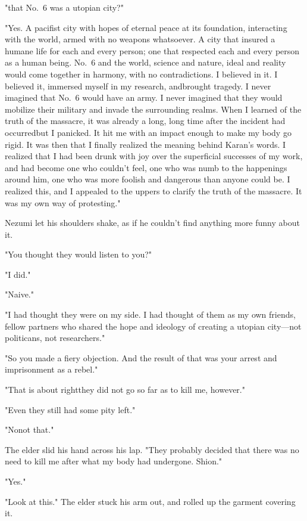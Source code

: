 "\el that No.~6 was a utopian city?"

"Yes. A pacifist city with hopes of eternal peace at its foundation,
interacting with the world, armed with no weapons whatsoever. A city
that insured a humane life for each and every person; one that respected
each and every person as a human being. No.~6 and the world, science and
nature, ideal and reality would come together in harmony, with no
contradictions. I believed in it. I believed it, immersed myself in my
research, and\el brought tragedy. I never imagined that No.~6 would have
an army. I never imagined that they would mobilize their military and
invade the surrounding realms. When I learned of the truth of the
massacre, it was already a long, long time after the incident had
occurred\el but I panicked. It hit me with an impact enough to make my
body go rigid. It was then that I finally realized the meaning behind
Karan's words. I realized that I had been drunk with joy over the
superficial successes of my work, and had become one who couldn't feel,
one who was numb to the happenings around him, one who was more foolish
and dangerous than anyone could be. I realized this, and I appealed to
the uppers to clarify the truth of the massacre. It was my own way of
protesting."

Nezumi let his shoulders shake, as if he couldn't find anything more
funny about it.

"You thought they would listen to you?"

"I did."

"Naive."

"I had thought they were on my side. I had thought of them as my own
friends, fellow partners who shared the hope and ideology of creating a
utopian city---not politicans, not researchers."

"So you made a fiery objection. And the result of that was your arrest
and imprisonment as a rebel."

"That is about right\el they did not go so far as to kill me, however."

"Even they still had some pity left."

"No\el not that."

The elder slid his hand across his lap. "They probably decided that
there was no need to kill me after what my body had undergone. Shion."

"Yes."

"Look at this." The elder stuck his arm out, and rolled up the garment
covering it.

